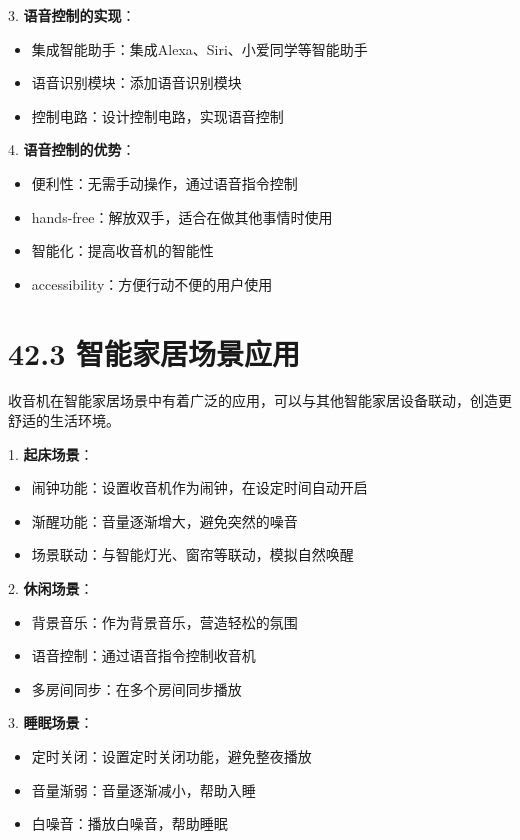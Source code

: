 \documentclass[12pt,UTF8]{ctexbook}
\begin{document}
3. \textbf{语音控制的实现}：
   \begin{itemize}[leftmargin=3.5em]
   \item 集成智能助手：集成Alexa、Siri、小爱同学等智能助手
   \item 语音识别模块：添加语音识别模块
   \item 控制电路：设计控制电路，实现语音控制
   \end{itemize}

4. \textbf{语音控制的优势}：
   \begin{itemize}[leftmargin=3.5em]
   \item 便利性：无需手动操作，通过语音指令控制
   \item  hands-free：解放双手，适合在做其他事情时使用
   \item 智能化：提高收音机的智能性
   \item  accessibility：方便行动不便的用户使用
   \end{itemize}

\section*{42.3 智能家居场景应用}

收音机在智能家居场景中有着广泛的应用，可以与其他智能家居设备联动，创造更舒适的生活环境。

1. \textbf{起床场景}：
   \begin{itemize}[leftmargin=3.5em]
   \item 闹钟功能：设置收音机作为闹钟，在设定时间自动开启
   \item 渐醒功能：音量逐渐增大，避免突然的噪音
   \item 场景联动：与智能灯光、窗帘等联动，模拟自然唤醒
   \end{itemize}

2. \textbf{休闲场景}：
   \begin{itemize}[leftmargin=3.5em]
   \item 背景音乐：作为背景音乐，营造轻松的氛围
   \item 语音控制：通过语音指令控制收音机
   \item 多房间同步：在多个房间同步播放
   \end{itemize}

3. \textbf{睡眠场景}：
   \begin{itemize}[leftmargin=3.5em]
   \item 定时关闭：设置定时关闭功能，避免整夜播放
   \item 音量渐弱：音量逐渐减小，帮助入睡
   \item 白噪音：播放白噪音，帮助睡眠
   \end{itemize}
\end{document}
